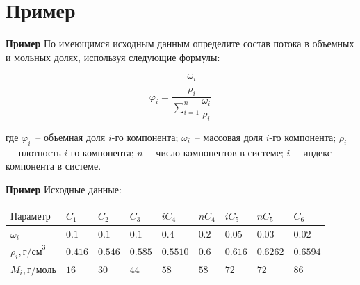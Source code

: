 \documentclass[aspectratio=169, mathserif]{beamer}%
\begin{document}
\section{Пример}
\sectionframe

\begin{frame}[fragile]{\space}
\scriptsize
\begin{alertblock}{\textbf{Пример}}
По имеющимся исходным данным определите состав потока в объемных и мольных долях, используя следующие формулы:
\end{alertblock}
\vfill
\begin{large}
\begin{equation*}
		\varphi _i = \dfrac{\dfrac{\omega _i}{\rho _i}}{\sum \limits _{i=1}^{n} \dfrac{\omega _i}{\rho _i}} 
\end{equation*}
\end{large}
\vfill
где $\varphi _i$~-- объемная доля $i$-го компонента; $\omega _i$~-- массовая доля $i$-го компонента; $\rho _i$~-- плотность $i$-го компонента; $n$~-- число компонентов в системе; $i$~-- индекс компонента в системе.
\vfill
\end{frame}

\begin{frame}[fragile]{\space}
\scriptsize
\begin{alertblock}{\textbf{Пример}}
Исходные данные:
\end{alertblock}
\begin{table}[h!]
	\begin{tabular}{|p{.2\linewidth}|p{.05\linewidth}|p{.05\linewidth}|p{.05\linewidth}|p{.05\linewidth}|p{.05\linewidth}|p{.05\linewidth}|p{.05\linewidth}|p{.05\linewidth}|}
		\hline
		$\mathrm{Параметр}$ & $C_1$ & $C_2$ & $C_3$ & $iC_4$ & $nC_4$ & $iC_5$ & $nC_5$ & $C_6$ \\
		\hline
		$\omega _i$ & $0.1$ & $0.1$ & $0.1$ & $0.4$ & $0.2$ & $0.05$ & $0.03$ & $0.02$ \\
		\hline
		$\rho_i, \mathrm{г/см}^3$ & $0.416$ & $0.546$ & $0.585$ & $0.5510$ & $0.6$ & $0.616$ & $0.6262$ & $0.6594$\\
		\hline
		$M_i, \mathrm{г/моль}$ & $16$ & $30$ & $44$ & $58$ & $58$ & $72$ & $72$ & $86$ \\
		\hline
	\end{tabular}
\end{table}
\vfill
\end{frame}
\end{document}

